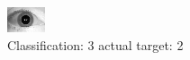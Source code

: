 \begin{figure}[h!]
\begin{center}
\includegraphics[width=0.60\columnwidth]{figures/ID1719_class_3_target_2.png}
\end{center}
\caption{ Classification: 3 actual target: 2}
\label{fig:ID1719_class_3_target_2}
\end{figure}
